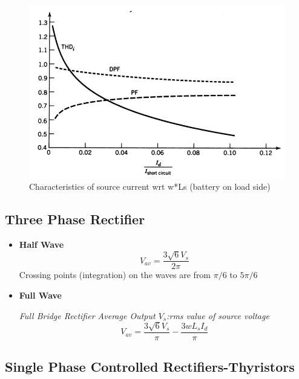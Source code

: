 \documentclass[twocolumn, ]{article}
\begin{document}
\begin{figure}[!ht]
	\includegraphics[scale=0.45]{avcur}
	\caption{Characteristics of source current wrt w*Ls (battery on load side)}
\end{figure}

\subsection*{\small Three Phase  Rectifier}

\begin{itemize}



\item \textbf{Half Wave} 
\begin{equation*}
	V_{av}=\dfrac{3 \sqrt{6}V_{s}} {2 \pi}
\end{equation*}
Crossing points (integration) on the waves are from $\pi /6$ to $5 \pi /6$

 

\item \textbf{Full Wave} 

\textit{Full Bridge Rectifier Average Output $V_{s}$:rms value of source voltage}
\begin{equation*}
 	V_{av}=\frac{3 \sqrt{6} V_{s}}{\pi }-\frac{3wL_{s}I_{d}}{\pi }
\end{equation*}





\end{itemize}


\subsection*{\small Single Phase Controlled Rectifiers-Thyristors}
\end{document}
